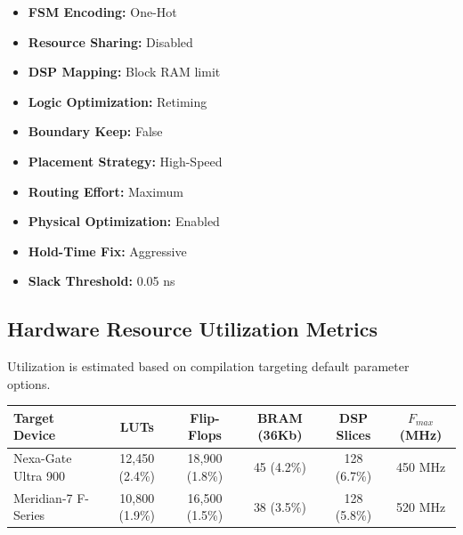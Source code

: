 \vspace{5pt}
\noindent
\begin{minipage}[t]{0.48\textwidth}
  \begin{tcolorbox}[
      colback=lightbg,
      colframe=primary,
      title=\textbf{Synthesis Directives},
      coltitle=white,
      fonttitle=\sffamily\bfseries\small,
      arc=2mm,
      height=3.6cm
  ]
      \small
      \begin{itemize}[leftmargin=12pt, nosep]
          \item \textbf{FSM Encoding:} One-Hot
          \item \textbf{Resource Sharing:} Disabled
          \item \textbf{DSP Mapping:} Block RAM limit
          \item \textbf{Logic Optimization:} Retiming
          \item \textbf{Boundary Keep:} False
      \end{itemize}
  \end{tcolorbox}
\end{minipage}
\hfill
\begin{minipage}[t]{0.48\textwidth}
  \begin{tcolorbox}[
      colback=lightbg,
      colframe=secondary,
      title=\textbf{Place \& Route Constraints},
      coltitle=white,
      fonttitle=\sffamily\bfseries\small,
      arc=2mm,
      height=3.6cm
  ]
      \small
      \begin{itemize}[leftmargin=12pt, nosep]
          \item \textbf{Placement Strategy:} High-Speed
          \item \textbf{Routing Effort:} Maximum
          \item \textbf{Physical Optimization:} Enabled
          \item \textbf{Hold-Time Fix:} Aggressive
          \item \textbf{Slack Threshold:} 0.05 ns
      \end{itemize}
  \end{tcolorbox}
\end{minipage}

\subsection{Hardware Resource Utilization Metrics}
Utilization is estimated based on compilation targeting default parameter options.

\noindent
\begin{tabularx}{\textwidth}{X c c c c c}
\toprule
\textbf{Target Device} & \textbf{LUTs} & \textbf{Flip-Flops} & \textbf{BRAM (36Kb)} & \textbf{DSP Slices} & \textbf{\(F_{max}\) (MHz)} \\
\midrule
Nexa-Gate Ultra 900 & 12,450 (2.4\%) & 18,900 (1.8\%) & 45 (4.2\%) & 128 (6.7\%) & 450 MHz \\
Meridian-7 F-Series & 10,800 (1.9\%) & 16,500 (1.5\%) & 38 (3.5\%) & 128 (5.8\%) & 520 MHz \\
\bottomrule
\end{tabularx}

